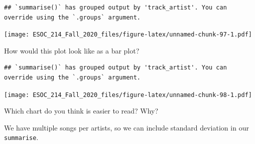 \documentclass[
]{book}
\newenvironment{Shaded}{\begin{snugshade}}{\end{snugshade}}
\newcommand{\DataTypeTok}[1]{\textcolor[rgb]{0.13,0.29,0.53}{#1}}
\newcommand{\KeywordTok}[1]{\textcolor[rgb]{0.13,0.29,0.53}{\textbf{#1}}}
\newcommand{\NormalTok}[1]{#1}
\newcommand{\OperatorTok}[1]{\textcolor[rgb]{0.81,0.36,0.00}{\textbf{#1}}}
\newcommand{\StringTok}[1]{\textcolor[rgb]{0.31,0.60,0.02}{#1}}
\begin{document}
\begin{verbatim}
## `summarise()` has grouped output by 'track_artist'. You can override using the `.groups` argument.
\end{verbatim}

\texttt{[image: ESOC\_214\_Fall\_2020\_files/figure-latex/unnamed-chunk-97-1.pdf]}

How would this plot look like as a bar plot?

\begin{Shaded}
\end{Shaded}

\begin{verbatim}
## `summarise()` has grouped output by 'track_artist'. You can override using the `.groups` argument.
\end{verbatim}

\texttt{[image: ESOC\_214\_Fall\_2020\_files/figure-latex/unnamed-chunk-98-1.pdf]}

Which chart do you think is easier to read? Why?

We have multiple songs per artists, so we can include standard deviation in our \texttt{summarise}.

\begin{Shaded}
\end{Shaded}
\end{document}
